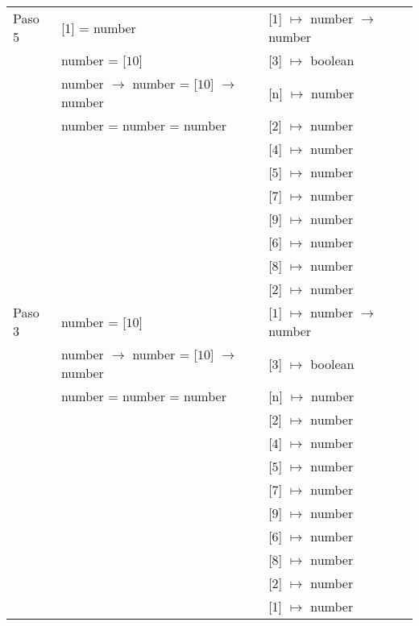 \documentclass{article}
\begin{document}
\begin{center}
\begin{longtable}{ | l | p{10 cm} | p{5 cm} | }
 Paso 5  & [1] = number								& [$\boxed{1}$] $\mapsto$ number $\rightarrow$ number	\\
	 & number = [$\boxed{10}$]						& [$\boxed{3}$] $\mapsto$ boolean \\
	 & number $\rightarrow$ number = [$\boxed{10}$] $\rightarrow$ number	& [n] $\mapsto$ number	\\ 
	 & number = number = number						& [2] $\mapsto$ number \\ 
	 &	& [$\boxed{4}$] $\mapsto$ number \\
	 &	& [$\boxed{5}$] $\mapsto$ number \\
	 &	& [$\boxed{7}$] $\mapsto$ number \\ 
	 &	& [$\boxed{9}$] $\mapsto$ number \\ 
	 &	& [$\boxed{6}$] $\mapsto$ number \\ 
	 &	& [$\boxed{8}$] $\mapsto$ number \\ 
	 &	& [$\boxed{2}$] $\mapsto$ number \\ \hline
	 
 Paso 3  & number = [$\boxed{10}$]						& [$\boxed{1}$] $\mapsto$ number $\rightarrow$ number \\
	 & number $\rightarrow$ number = [$\boxed{10}$] $\rightarrow$ number	& [$\boxed{3}$] $\mapsto$ boolean \\ 
	 & number = number = number						& [n] $\mapsto$ number \\ 
	 &	& [2] $\mapsto$ number \\
	 &	& [$\boxed{4}$] $\mapsto$ number \\
	 &	& [$\boxed{5}$] $\mapsto$ number \\
	 &	& [$\boxed{7}$] $\mapsto$ number \\ 
	 &	& [$\boxed{9}$] $\mapsto$ number \\ 
	 &	& [$\boxed{6}$] $\mapsto$ number \\ 
	 &	& [$\boxed{8}$] $\mapsto$ number \\ 
	 &	& [$\boxed{2}$] $\mapsto$ number \\ 
	 &	& [1] $\mapsto$ number \\ \hline
	 

\end{longtable}
\end{center}
\end{document}
